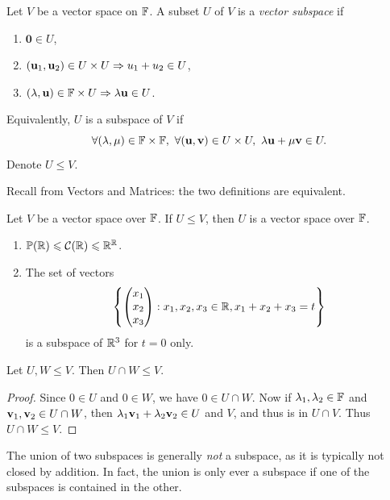 \documentclass[a4paper]{article}
\begin{document}
\begin{definition}[Subspace]
    Let $V$ be a vector space on ${\mathbb{F}}$. A subset $U$ of $V$ is a \textit{vector subspace} if 
    \begin{enumerate}
        \item $ \mathbf{0}\in U $,
        \item $ ({\bf u}_1,{\bf u}_2)\in U\times U \Rightarrow u_1+u_2\in U $,
        \item $ (\lambda,{\bf u})\in {\mathbb{F}}\times U \Rightarrow \lambda{\bf u}\in U $.
    \end{enumerate}
    Equivalently, $U$ is a subspace of $V$ if 
    \[
        \forall (\lambda,\mu)\in {\mathbb{F}}\times {\mathbb{F}},\ \forall ({\bf u},{\bf v})\in U\times U,\ \lambda{\bf u}+\mu{\bf v}\in U.
    \]
    Denote $ U\le V $.
\end{definition}
Recall from Vectors and Matrices: the two definitions are equivalent.
\begin{proposition}
    Let $ V $ be a vector space over ${\mathbb{F}}$. If $ U\le V $, then $U$ is a vector space over ${\mathbb{F}}$.
\end{proposition}
\begin{example}
    \begin{enumerate}
        \item $ \mathbb{P}({\mathbb{R}})\leqslant {\mathcal{C}}({\mathbb{R}})\leqslant \mathbb{R} ^\mathbb{R}  $.
        \item The set of vectors
        $$
        \left\{\begin{pmatrix}x_1 \\ x_2 \\ x_3\end{pmatrix} : x_1, x_2, x_3 \in {\mathbb{R}}, x_1 + x_2 + x_3 = t\right\}
        $$
        is a subspace of ${\mathbb{R}}^3$ for $t = 0$ only.
    \end{enumerate}
\end{example}
\begin{proposition}
    Let $U, W \le V$. Then $U \cap W \le V$.
\end{proposition}
\begin{proof}
    Since $0 \in U$ and $0 \in W$, we have $0 \in U \cap W$. Now if $\lambda_1, \lambda_2 \in {\mathbb{F}}$ and ${\bf v}_1, {\bf v}_2 \in U \cap W$, then $\lambda_1 {\bf v}_1 + \lambda_2 {\bf v}_2 \in U$ and $V$, and thus is in $U \cap V$. Thus $U \cap W \le V$.
\end{proof}
The union of two subspaces is generally \emph{not} a subspace, as it is typically not closed by addition. In fact, the union is only ever a subspace if one of the subspaces is contained in the other. 
\end{document}
